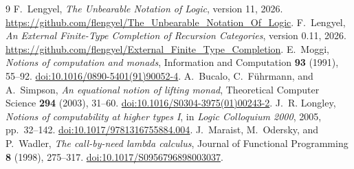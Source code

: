 \documentclass[11pt]{article}
\theoremstyle{definition}
\begin{document}
\begin{thebibliography}{9}
\small
{} F.~Lengyel, \emph{The Unbearable Notation of Logic},
version 11, 2026.
\url{https://github.com/flengyel/The_Unbearable_Notation_Of_Logic}.
 F.~Lengyel, \emph{An External Finite-Type Completion
of Recursion Categories}, version 0.11, 2026.
\url{https://github.com/flengyel/External_Finite_Type_Completion}.
 E.~Moggi, \emph{Notions of computation and monads},
Information and Computation \textbf{93} (1991), 55--92.
\href{https://doi.org/10.1016/0890-5401(91)90052-4}{doi:10.1016/0890-5401(91)90052-4}.
 A.~Bucalo, C.~F\"uhrmann, and A.~Simpson,
\emph{An equational notion of lifting monad},
Theoretical Computer Science \textbf{294} (2003), 31--60.
\href{https://doi.org/10.1016/S0304-3975(01)00243-2}{doi:10.1016/S0304-3975(01)00243-2}.
 J.~R. Longley, \emph{Notions of computability at higher
types I}, in \emph{Logic Colloquium 2000}, 2005, pp.~32--142.
\href{https://doi.org/10.1017/9781316755884.004}{doi:10.1017/9781316755884.004}.
 J.~Maraist, M.~Odersky, and P.~Wadler,
\emph{The call-by-need lambda calculus}, Journal of Functional
Programming \textbf{8} (1998), 275--317.
\href{https://doi.org/10.1017/S0956796898003037}{doi:10.1017/S0956796898003037}.
\end{thebibliography}
\end{document}
